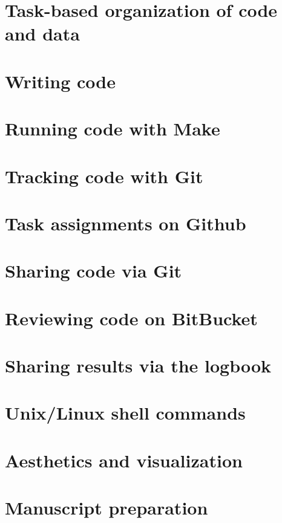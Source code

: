 \documentclass{report}
\numberwithin{equation}{section}
\numberwithin{figure}{section}
\numberwithin{table}{section}
\begin{document}
\section{Task-based organization of code and data} 
\section{Writing code} 
\section{Running code with Make} 
\section{Tracking code with Git} 

\section{Task assignments on Github} 
\section{Sharing code via Git} 
\section{Reviewing code on BitBucket} 
\section{Sharing results via the logbook} 

\section{Unix/Linux shell commands} 
\section{Aesthetics and visualization} 
\section{Manuscript preparation} 
\end{document}
